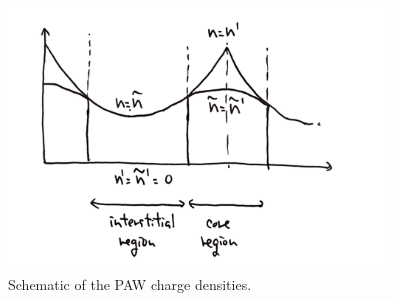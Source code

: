 \documentclass{article}
\begin{document}
\begin{figure}[H]
  \begin{center}
  \includegraphics[width=100mm]{figures/PAW_charge.png}
  \caption{Schematic of the PAW charge densities.}
  \end{center}
\end{figure}
\end{document}
